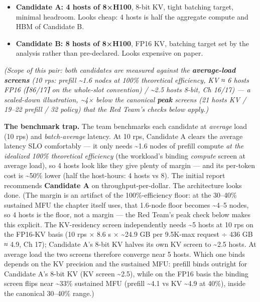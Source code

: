 \begin{itemize}
\tightlist
\item
  \textbf{Candidate A: 4 hosts of 8×H100}, 8-bit KV, tight batching
  target, minimal headroom. Looks cheap: 4 hosts is half the aggregate
  compute and HBM of Candidate B.
\item
  \textbf{Candidate B: 8 hosts of 8×H100}, FP16 KV, batching target set
  by the analysis rather than pre-declared. Looks expensive on paper.
\end{itemize}

\emph{(Scope of this pair: both candidates are measured against the
\textbf{average-load screens} (10 rps: prefill \textasciitilde1.6 nodes
at 100\% theoretical efficiency, KV ≈ 6 hosts FP16 (⌈86/17⌉ on the
whole-slot convention) / \textasciitilde2.5 hosts 8-bit, Ch 16/17) --- a
scaled-down illustration, \textasciitilde4× below the canonical
\textbf{peak} screens (21 hosts KV / 19--22 prefill / 32 policy) that
the Red Team's checks below apply.)}

\textbf{The benchmark trap.} The team benchmarks each candidate at
\emph{average} load (10 rps) and \emph{batch-average} latency. At 10
rps, Candidate A clears the average latency SLO comfortably --- it only
needs \textasciitilde1.6 nodes of prefill compute \emph{at the idealized
100\% theoretical efficiency} (the workload's binding \emph{compute}
screen at average load), so 4 hosts look like they give plenty of margin
--- and its per-token cost is \textasciitilde50\% lower (half the
host-hours: 4 hosts vs 8). The initial report recommends
\textbf{Candidate A} on throughput-per-dollar. The architecture looks
done. (The margin is an artifact of the 100\%-efficiency floor: at the
30--40\% sustained MFU the chapter itself uses, that 1.6-node floor
becomes \textasciitilde4--5 nodes, so 4 hosts is the floor, not a margin
--- the Red Team's peak check below makes this explicit. The
KV-residency screen independently needs \textasciitilde5 hosts at 10 rps
on the FP16-KV basis (10 rps × 8.6 s × \textasciitilde24.9 GB per
9.5K-max request ÷ 436 GB ≈ 4.9, Ch 17); Candidate A's 8-bit KV halves
its own KV screen to \textasciitilde2.5 hosts. At average load the two
screens therefore converge near 5 hosts. Which one binds depends on the
KV precision and the sustained MFU: prefill binds outright for Candidate
A's 8-bit KV (KV screen \textasciitilde2.5), while on the FP16 basis the
binding screen flips near \textasciitilde33\% sustained MFU (prefill
\textasciitilde4.1 vs KV \textasciitilde4.9 at 40\%), inside the
canonical 30--40\% range.)


